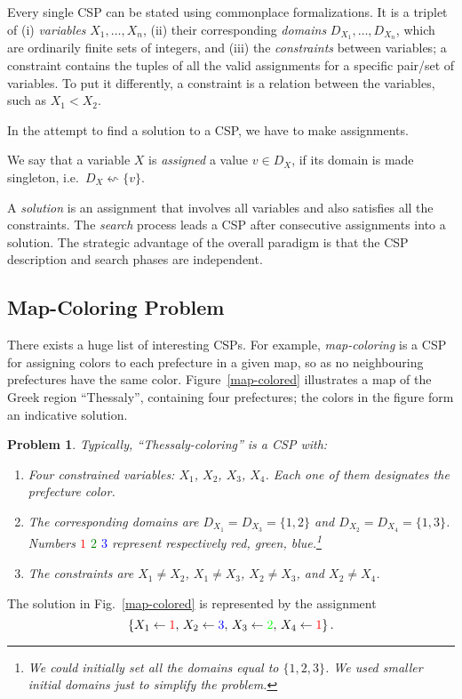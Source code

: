 \documentclass{ws-ijait}
\newtheorem{problem}{Problem}
\begin{document}
Every single CSP can be stated using commonplace formalizations. It is a triplet of (i) \emph{variables} $X_1, \ldots, X_n$, (ii) their corresponding \emph{domains} $D_{X_1}, \ldots, D_{X_n}$, which are ordinarily finite sets of integers, and (iii) the \emph{constraints} between variables; a constraint contains the tuples of all the valid assignments for a specific pair\slash set of variables. To put it differently, a constraint is a relation between the variables, such as $X_1 < X_2$.

In the attempt to find a solution to a CSP, we have to make assignments.
\begin{definition}
We say that a variable $X$ is \emph{assigned} a value $v \in D_X$, if its domain is made singleton, i.e.\ $D_X \leftsquigarrow \{v\}$.
\end{definition}
A \emph{solution} is an assignment that involves all variables and also satisfies all the constraints. The \emph{search} process leads a CSP after consecutive assignments into a solution. The strategic advantage of the overall paradigm is that the CSP description and search phases are independent.\cite{grand-challenges}


\subsection{Map-Coloring Problem}

There exists a huge list of interesting CSPs.\cite{CSPLib} For example, \emph{map-coloring} is a CSP for assigning colors to each prefecture in a given map, so as no neighbouring prefectures have the same color. Figure~\ref{map-colored} illustrates a map of the Greek region ``Thessaly'', containing four prefectures; the colors in the figure form an indicative solution.
\begin{problem}
\label{thessaly-coloring}
Typically, \emph{``Thessaly-coloring''} is a CSP with:
\begin{enumerate}
\item
Four constrained variables: $X_1$, $X_2$, $X_3$, $X_4$. Each one of them designates the prefecture color.
\item
The corresponding domains are $D_{X_1} = D_{X_3} = \{1,2\}$ and $D_{X_2} = D_{X_4} = \{1,3\}$. Numbers \textcolor{red}{$1$} \textcolor{green}{$2$} \textcolor{blue}{$3$} represent respectively red, green, blue.\footnote{We could initially set all the domains equal to $\{1, 2, 3\}$. We used smaller initial domains just to simplify the problem.}
\item
The constraints are $X_1 \neq X_2$, $X_1 \neq X_3$, $X_2 \neq X_3$, and $X_2 \neq X_4$.
\end{enumerate}
\end{problem}
The solution in Fig.~\ref{map-colored} is represented by the assignment
\begin{equation}
\label{solution}
\{ X_1 \gets \textcolor{red}{1}, \, X_2 \gets \textcolor{blue}{3}, \, X_3 \gets \textcolor{green}{2}, \, X_4 \gets \textcolor{red}{1} \} \, .
\end{equation}
\end{document}

